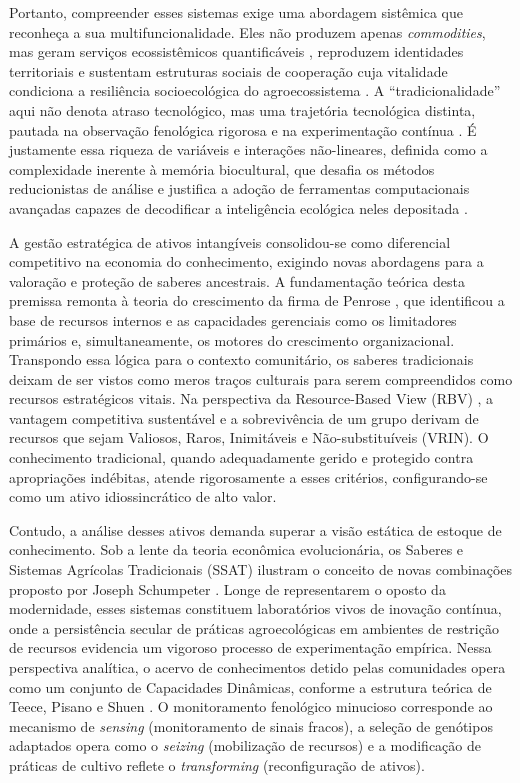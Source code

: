 Portanto, compreender esses sistemas exige uma abordagem sistêmica que reconheça a sua multifuncionalidade. Eles não produzem apenas \textit{commodities}, mas geram serviços ecossistêmicos quantificáveis \cite{Costanza1997}, reproduzem identidades territoriais \cite{CalvetMir2016} e sustentam estruturas sociais de cooperação cuja vitalidade condiciona a resiliência socioecológica do agroecossistema \cite{Folke2016}. A ``tradicionalidade'' aqui não denota atraso tecnológico, mas uma trajetória tecnológica distinta, pautada na observação fenológica rigorosa e na experimentação contínua \cite{GomezBaggethun2013}. É justamente essa riqueza de variáveis e interações não-lineares, definida como a complexidade inerente à memória biocultural, que desafia os métodos reducionistas de análise e justifica a adoção de ferramentas computacionais avançadas capazes de decodificar a inteligência ecológica neles depositada \cite{Berkes2003}.

A gestão estratégica de ativos intangíveis consolidou-se como diferencial competitivo na economia do conhecimento, exigindo novas abordagens para a valoração e proteção de saberes ancestrais. A fundamentação teórica desta premissa remonta à teoria do crescimento da firma de Penrose \cite{Penrose1959}, que identificou a base de recursos internos e as capacidades gerenciais como os limitadores primários e, simultaneamente, os motores do crescimento organizacional. Transpondo essa lógica para o contexto comunitário, os saberes tradicionais deixam de ser vistos como meros traços culturais para serem compreendidos como recursos estratégicos vitais. Na perspectiva da Resource-Based View (RBV) \cite{Barney1991}, a vantagem competitiva sustentável e a sobrevivência de um grupo derivam de recursos que sejam Valiosos, Raros, Inimitáveis e Não-substituíveis (VRIN). O conhecimento tradicional, quando adequadamente gerido e protegido contra apropriações indébitas, atende rigorosamente a esses critérios, configurando-se como um ativo idiossincrático de alto valor.

Contudo, a análise desses ativos demanda superar a visão estática de estoque de conhecimento. Sob a lente da teoria econômica evolucionária, os Saberes e Sistemas Agrícolas Tradicionais (SSAT) ilustram o conceito de novas combinações proposto por Joseph Schumpeter \cite{Schumpeter1934}. Longe de representarem o oposto da modernidade, esses sistemas constituem laboratórios vivos de inovação contínua, onde a persistência secular de práticas agroecológicas em ambientes de restrição de recursos evidencia um vigoroso processo de experimentação empírica. Nessa perspectiva analítica, o acervo de conhecimentos detido pelas comunidades opera como um conjunto de Capacidades Dinâmicas, conforme a estrutura teórica de Teece, Pisano e Shuen \cite{Teece1997}. O monitoramento fenológico minucioso corresponde ao mecanismo de \textit{sensing} (monitoramento de sinais fracos), a seleção de genótipos adaptados opera como o \textit{seizing} (mobilização de recursos) e a modificação de práticas de cultivo reflete o \textit{transforming} (reconfiguração de ativos).

